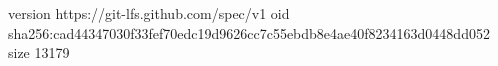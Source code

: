 version https://git-lfs.github.com/spec/v1
oid sha256:cad44347030f33fef70edc19d9626cc7c55ebdb8e4ae40f8234163d0448dd052
size 13179
